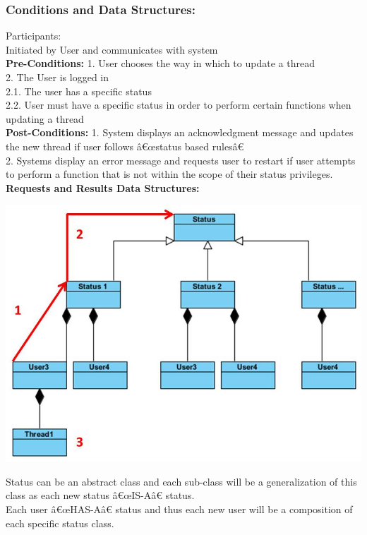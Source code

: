 \documentclass[a4paper,11pt]{article}
\begin{document}
\subsubsection{Conditions and Data Structures:}
Participants:\\
Initiated by User and communicates with system\\
\textbf{Pre-Conditions:}
1.	User chooses the way in which to update a thread\\
2.	The User is logged in \\
2.1.	The user has a specific status\\
2.2.	User must have a specific status in order to perform certain functions when updating a thread\\
\textbf{Post-Conditions:}
1.	System displays an acknowledgment message and updates  the new thread  if user follows â€œstatus based rulesâ€\\
2.	Systems display an error message and requests user to restart if user attempts to perform a function that is not within the scope of their status privileges.\\
\textbf{Requests and Results Data Structures:}
\begin{center}
\includegraphics[width=1\linewidth]{./Images/CRUDThread/Diagrams/9.jpg}\\
\end{center}
Status can be an abstract class and each sub-class will be a generalization of this class as each new status â€œIS-Aâ€ status.\\
Each user â€œHAS-Aâ€ status and thus each new user will be a composition of each specific status class.\\
\end{document}
